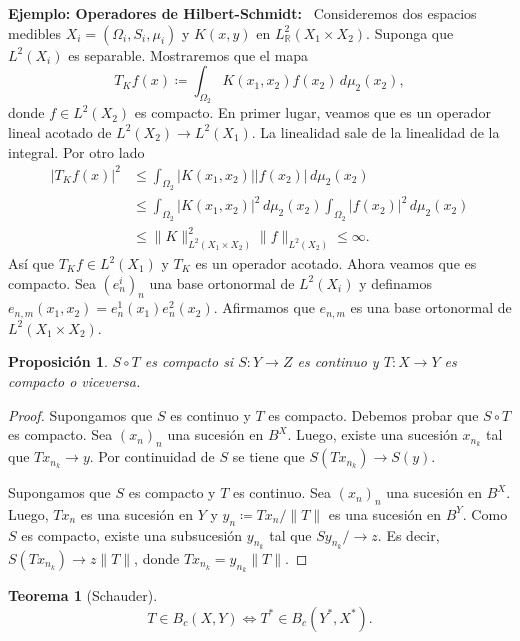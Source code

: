 \documentclass{article}
\newtheorem{Teorema}{Teorema}
\newtheorem{Proposicion}{Proposición}
\theoremstyle{plain}
\theoremstyle{definition}
\newcommand{\1}[1]{\mathbbm{1}\left( #1 \right)}
\newcommand{\R}{\mathbb{R}}
\newcommand{\abs}[1]{\lvert #1 \rvert}
\newcommand{\norm}[1]{\lVert #1 \rVert}
\begin{document}
\noindent\textbf{Ejemplo: Operadores de Hilbert-Schmidt:}~%
Consideremos dos espacios medibles \(X_i = (\Omega_i, S_i, \mu_i)\) y \(K(x,y)\)
en \(L^2_{\R}(X_1\times X_2)\). Suponga que \(L^2(X_i)\) es separable. Mostraremos que el mapa
\begin{displaymath}
  T_K f(x) \coloneqq
  \int_{\Omega_2} K(x_1, x_2) f(x_2) \, d\mu_2(x_2),
\end{displaymath}
donde \(f\in L^2(X_2)\) es compacto. En primer lugar, veamos que es un operador
lineal acotado de \(L^2(X_2) \to L^2(X_1)\). La linealidad sale de la linealidad de 
la integral. Por otro lado
\begin{align*}
  \abs{T_K f(x)}^2
  &\le
  \int_{\Omega_2} \abs{K(x_1,x_2)} \abs{f(x_2)} \,d\mu_2(x_2)
  \\&\le
  \int_{\Omega_2} \abs{K(x_1,x_2)}^2\, d\mu_{2}(x_2)
  \int_{\Omega_2} \abs{f(x_2)}^2 \, d\mu_{2}(x_2)
  \\&\le
  \norm{K}^2_{L^2(X_1\times X_2)}
  \norm{f}_{L^2(X_2)}
  \le \infty.
\end{align*}
Así que \(T_K f \in L^2(X_1)\) y \(T_K\) es un operador acotado.  
Ahora veamos que es compacto. Sea \((e^i_n)_n\) una base ortonormal de \(L^2(X_i)\) y 
definamos \(e_{n,m}(x_1,x_2) = e^{1}_n(x_1) e^2_n(x_2)\). Afirmamos que \(e_{n,m}\)
es una base ortonormal de \(L^2(X_1\times X_2)\). 

\begin{Proposicion}
  \(S\circ T\) es compacto si \(S\colon Y \to Z\) es continuo y \(T\colon X \to Y\) es compacto o viceversa.
\end{Proposicion}
\begin{proof}
  Supongamos que \(S\) es continuo y \(T\) es compacto. Debemos probar que
  \(S\circ T\) es compacto. Sea \((x_n)_n\) una sucesión en \(B^X\). Luego,
  existe una sucesión \(x_{n_k}\) tal que \(T x_{n_k} \to y\). 
  Por continuidad de \(S\) se tiene que \(S(T x_{n_k}) \to S(y)\).

  Supongamos que \(S\) es compacto y \(T\) es continuo. Sea \((x_n)_{n}\) una sucesión
  en \(B^{X}\). Luego, \(Tx_n\) es una sucesión en \(Y\) y \(y_n \coloneqq Tx_n/\norm{T}\)
  es una sucesión en \(B^{Y}\). Como \(S\) es compacto, existe una subsucesión
  \(y_{n_k}\) tal que \(S y_{n_k}/ \to z\). Es decir,
  \(S(T x_{n_k}) \to z\norm{T}\), donde \(T x_{n_k} = y_{n_k} \norm{T}\).
\end{proof}

\begin{Teorema}[Schauder]
  \begin{displaymath}
    T\in B_c(X,Y) \iff T^{\ast} \in B_c(Y^{\ast}, X^{\ast}).
  \end{displaymath}
\end{Teorema}
\end{document}
